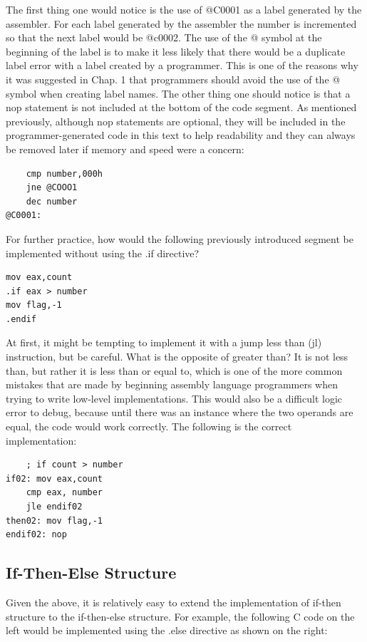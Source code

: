 \documentclass[10pt]{article}
\begin{document}
The first thing one would notice is the use of @C0001 as a label generated by the assembler. For each label generated by the assembler the number is incremented so that the next label would be @c0002. The use of the @ symbol at the beginning of the label is to make it less likely that there would be a duplicate label error with a label created by a programmer. This is one of the reasons why it was suggested in Chap. 1 that programmers should avoid the use of the @ symbol when creating label names. The other thing one should notice is that a nop statement is not included at the bottom of the code segment. As mentioned previously, although nop statements are optional, they will be included in the programmer-generated code in this text to help readability and they can always be removed later if memory and speed were a concern:

\begin{verbatim}
    cmp number,000h
    jne @COOO1
    dec number
@C0001:
\end{verbatim}

For further practice, how would the following previously introduced segment be implemented without using the .if directive?

\begin{verbatim}
mov eax,count
.if eax > number
mov flag,-1
.endif
\end{verbatim}

At first, it might be tempting to implement it with a jump less than (jl) instruction, but be careful. What is the opposite of greater than? It is not less than, but rather it is less than or equal to, which is one of the more common mistakes that are made by beginning assembly language programmers when trying to write low-level implementations. This would also be a difficult logic error to debug, because until there was an instance where the two operands are equal, the code would work correctly. The following is the correct implementation:

\begin{verbatim}
    ; if count > number
if02: mov eax,count
    cmp eax, number
    jle endif02
then02: mov flag,-1
endif02: nop
\end{verbatim}

\subsection*{If-Then-Else Structure}
Given the above, it is relatively easy to extend the implementation of if-then structure to the if-then-else structure. For example, the following C code on the left would be implemented using the .else directive as shown on the right:
\end{document}
